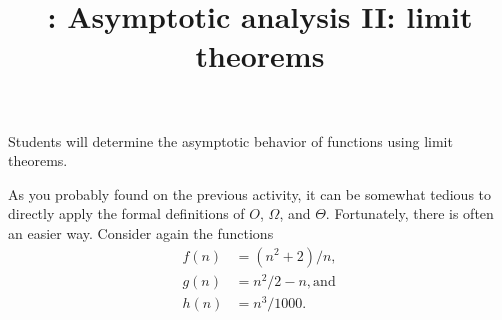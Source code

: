 \documentclass{tufte-handout}
\title{\thecourse: Asymptotic analysis II: limit theorems}
\date{}
\begin{document}
\maketitle

\begin{objective}
  Students will determine the asymptotic behavior of functions using
  limit theorems.
\end{objective}
As you probably found on the previous activity, it can be somewhat
tedious to directly apply the formal definitions of $O$, $\Omega$, and
$\Theta$.  Fortunately, there is often an easier way.  Consider again
the functions
\begin{align*}
  f(n) &= (n^2 + 2)/n, \\ g(n) &= n^2/2 - n, \text{and} \\ h(n) &= n^3/1000.
\end{align*}
\end{document}
